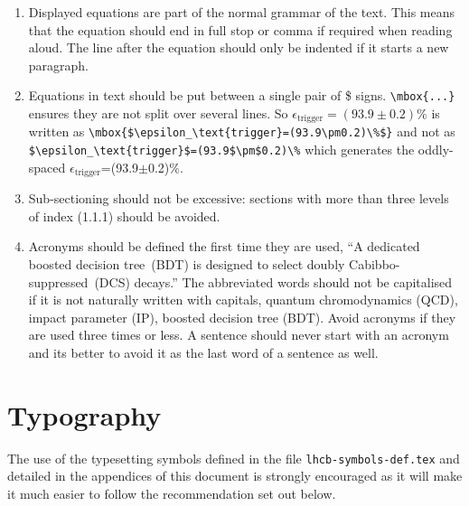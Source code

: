\begin{enumerate}
\item Displayed equations are part of the normal grammar of the
  text. This means that the equation should end in full stop or comma if
  required when reading aloud. The line after the equation should only
  be indented if it starts a new paragraph.

\item Equations in text should be put between a single pair of \$ signs.
  \verb!\mbox{...}! ensures they are not split over several lines.
  So \mbox{$\epsilon_\text{trigger}=(93.9\pm0.2)\%$} is written as
  \verb!\mbox{$\epsilon_\text{trigger}=(93.9\pm0.2)\%$}! and not as
  \verb!$\epsilon_\text{trigger}$=(93.9$\pm$0.2)\%! which generates the oddly-spaced $\epsilon_\text{trigger}$=(93.9$\pm$0.2)\%.

\item Sub-sectioning should not be excessive: sections with more than three
levels of index (1.1.1) should be avoided.


\item Acronyms should be defined the first time they are used,
  \eg ``A dedicated boosted decision tree~(BDT) is designed to select doubly Cabibbo-suppressed~(DCS) decays.''
  The abbreviated words should not be capitalised if it is not naturally
  written with capitals, \eg quantum chromodynamics (QCD),
  impact parameter (IP), boosted decision tree (BDT).
  Avoid acronyms if they are used three times or less.
  A sentence should never start with an acronym and its better to
  avoid it as the last word of a sentence as well.

\end{enumerate}

\section{Typography}
\label{sec:typography}

The use of the \latex typesetting symbols defined in the file
\texttt{lhcb-symbols-def.tex} and detailed in the appendices of this
document is strongly encouraged as it will make it much easier to
follow the recommendation set out below.

